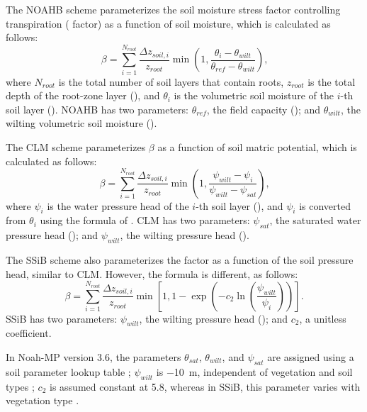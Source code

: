 \documentclass[essd, manuscript]{copernicus}
\let\unit\undefined
\begin{document}
The NOAHB scheme parameterizes the soil moisture stress factor controlling transpiration (\beta{} factor) as a function of soil moisture, which is calculated as follows:
\begin{equation}
  \beta = \sum_{i=1}^{N_{root}} \frac{\Delta z_{soil,i}}{z_{root}}
  \min(1, \frac{\theta_i - \theta_{wilt}}{\theta_{ref} - \theta_{wilt}})
  \text{,}
\end{equation}
where \(N_{root}\) is the total number of soil layers that contain roots, \(z_{root}\) is the total depth of the root-zone layer (\unit{m}), and \(\theta_i\) is the volumetric soil moisture of the \(i\)-th soil layer (\unit{m^3.m^{-3}}). NOAHB has two parameters: \(\theta_{ref}\), the field capacity (\unit{m^3.m^{-3}}); and \(\theta_{wilt}\), the wilting volumetric soil moisture (\unit{m^3.m^{-3}}).

The CLM scheme \citep{oleson2004} parameterizes \(\beta\) as a function of soil matric potential, which is calculated as follows:
\begin{equation}
  \beta = \sum_{i=1}^{N_{root}} \frac{\Delta z_{soil,i}}{z_{root}}
  \min(1, \frac{\psi_{wilt} - \psi_i}{\psi_{wilt} - \psi_{sat}})
  \text{,}
\end{equation}
where \(\psi_i\) is the water pressure head of the \(i\)-th soil layer (\unit{m}), and \(\psi_i\) is converted from \(\theta_i\) using the formula of \citet{clapp1978WRR}. CLM has two parameters: \(\psi_{sat}\), the saturated water pressure head (\unit{m}); and \(\psi_{wilt}\), the wilting pressure head (\unit{m}).

The SSiB scheme \citep{xue1991JC} also parameterizes the \beta{} factor as a function of the soil pressure head, similar to CLM\@. However, the formula is different, as follows:
\begin{equation}
  \beta = \sum_{i=1}^{N_{root}} \frac{\Delta z_{soil,i}}{z_{root}}
  \min\left[1, 1 - \exp\left(-c_2 \ln(\frac{\psi_{wilt}}{\psi_{i}})\right)\right]
  \text{.}
\end{equation}
SSiB has two parameters: \(\psi_{wilt}\), the wilting pressure head (\unit{m}); and \(c_2\), a unitless coefficient.

In Noah-MP version 3.6, the parameters \(\theta_{sat}\), \(\theta_{wilt}\), and \(\psi_{sat}\) are assigned using a soil parameter lookup table \citep[Table 2]{chen2001MWR}; \(\psi_{wilt}\) is \qty{-10}{m}, independent of vegetation and soil types \citep{niu2011JGRA}; \(c_2\) is assumed constant at \num{5.8}, whereas in SSiB, this parameter varies with vegetation type \citep[Table 2]{xue1991JC}.
\end{document}

